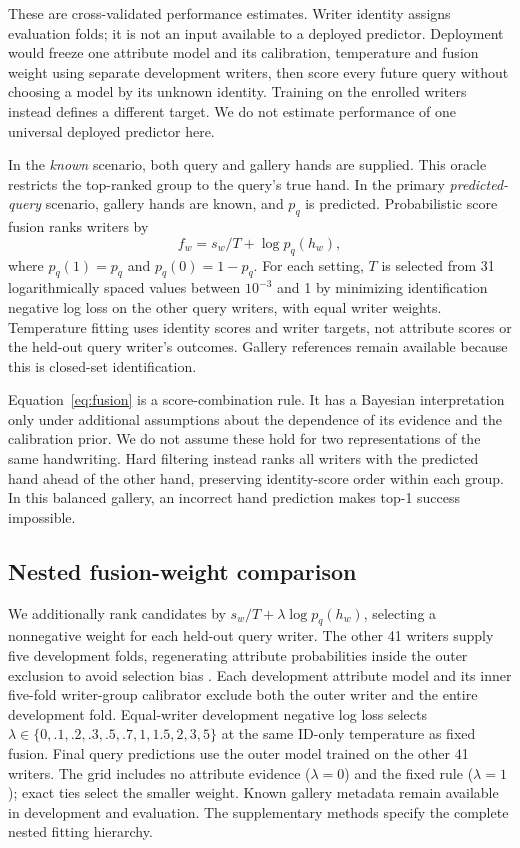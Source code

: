 These are cross-validated performance estimates. Writer identity assigns evaluation folds; it is not an input available to a deployed predictor. Deployment would freeze one attribute model and its calibration, temperature and fusion weight using separate development writers, then score every future query without choosing a model by its unknown identity. Training on the enrolled writers instead defines a different target. We do not estimate performance of one universal deployed predictor here.

In the \emph{known} scenario, both query and gallery hands are supplied. This oracle restricts the top-ranked group to the query's true hand. In the primary \emph{predicted-query} scenario, gallery hands are known, and $p_q$ is predicted. Probabilistic score fusion ranks writers by
\begin{equation}
 f_w=s_w/T+\log p_q(h_w),
 \label{eq:fusion}
\end{equation}
where $p_q(1)=p_q$ and $p_q(0)=1-p_q$. For each setting, $T$ is selected from 31 logarithmically spaced values between $10^{-3}$ and 1 by minimizing identification negative log loss on the other query writers, with equal writer weights. Temperature fitting uses identity scores and writer targets, not attribute scores or the held-out query writer's outcomes. Gallery references remain available because this is closed-set identification.

Equation~\eqref{eq:fusion} is a score-combination rule. It has a Bayesian interpretation only under additional assumptions about the dependence of its evidence and the calibration prior. We do not assume these hold for two representations of the same handwriting. Hard filtering instead ranks all writers with the predicted hand ahead of the other hand, preserving identity-score order within each group. In this balanced gallery, an incorrect hand prediction makes top-1 success impossible.

\subsection{Nested fusion-weight comparison}
\label{sec:nested}
We additionally rank candidates by $s_w/T+\lambda\log p_q(h_w)$, selecting a nonnegative weight for each held-out query writer. The other 41 writers supply five development folds, regenerating attribute probabilities inside the outer exclusion to avoid selection bias \cite{cawley2010selection}. Each development attribute model and its inner five-fold writer-group calibrator exclude both the outer writer and the entire development fold. Equal-writer development negative log loss selects $\lambda\in\{0,.1,.2,.3,.5,.7,1,1.5,2,3,5\}$ at the same ID-only temperature as fixed fusion. Final query predictions use the outer model trained on the other 41 writers. The grid includes no attribute evidence ($\lambda=0$) and the fixed rule ($\lambda=1$); exact ties select the smaller weight. Known gallery metadata remain available in development and evaluation. The supplementary methods specify the complete nested fitting hierarchy.

